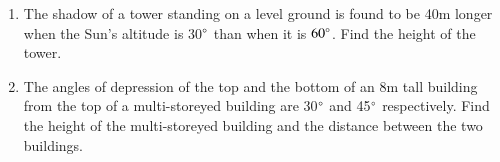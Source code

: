 \begin{enumerate}[label=\arabic*.,ref=\thesubsection.\theenumi]
\item The shadow of a tower standing on a level ground is found to be 40m longer when the Sun's altitude is 30$\degree$ than when it is $60\degree$.  Find the height of the tower.
%
%
\item The angles of depression of the top and the bottom of an 8m tall building from the top of a multi-storeyed building are 30$\degree$ and 45$\degree$ respectively.  Find the height of the multi-storeyed building and the distance between the two buildings.
%

\end{enumerate}
